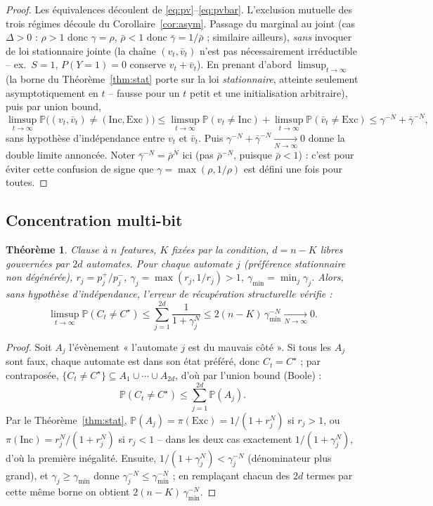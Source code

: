 \documentclass[12pt,a4paper]{article}
\newtheorem{theorem}{Théorème}
\newcommand{\Inc}{\ensuremath{\mathrm{Inc}}}
\newcommand{\Exc}{\ensuremath{\mathrm{Exc}}}
\newcommand{\vbar}{\bar{v}}
\begin{document}
\begin{proof}
Les équivalences découlent de \eqref{eq:pv}--\eqref{eq:pvbar}. L'exclusion
mutuelle des trois régimes découle du Corollaire~\ref{cor:asym}. Passage du
marginal au joint (cas $\Delta>0$ : $\rho>1$ donc $\gamma=\rho$, $\bar\rho<1$
donc $\bar\gamma=1/\bar\rho$ ; similaire ailleurs), \emph{sans} invoquer de loi
stationnaire jointe (la chaîne $(v_t,\vbar_t)$ n'est pas nécessairement
irréductible -- ex.\ $S{=}1$, $P(Y{=}1){=}0$ conserve $v_t+\vbar_t$). En
prenant d'abord $\limsup_{t\to\infty}$ (la borne du Théorème~\ref{thm:stat}
porte sur la loi \emph{stationnaire}, atteinte seulement asymptotiquement en
$t$ -- fausse pour un $t$ petit et une initialisation arbitraire), puis par
union bound,
\[
  \limsup_{t\to\infty}\mathbb P\bigl((v_t,\vbar_t)\ne(\Inc,\Exc)\bigr)
  \le \limsup_{t\to\infty}\mathbb P(v_t\ne\Inc)+\limsup_{t\to\infty}\mathbb P(\vbar_t\ne\Exc)
  \le \gamma^{-N}+\bar\gamma^{-N},
\]
sans hypothèse d'indépendance entre $v_t$ et $\vbar_t$. Puis
$\gamma^{-N}+\bar\gamma^{-N}\xrightarrow[N\to\infty]{}0$ donne la double
limite annoncée. Noter $\bar\gamma^{-N}=\bar\rho^N$ ici (pas $\bar\rho^{-N}$,
puisque $\bar\rho<1$) : c'est pour éviter cette confusion de signe que
$\gamma=\max(\rho,1/\rho)$ est défini une fois pour toutes.
\end{proof}



\subsection*{Concentration multi-bit}

\begin{theorem}\label{thm:multi}
Clause à $n$ features, $K$ fixées par la condition, $d=n-K$ libres gouvernées par
$2d$ automates. Pour chaque automate $j$ (préférence stationnaire non
dégénérée), $r_j=p_j^+/p_j^-$, $\gamma_j=\max(r_j,1/r_j)>1$,
$\gamma_{\min}=\min_j\gamma_j$. Alors, sans hypothèse d'indépendance,
l'erreur de \emph{récupération structurelle} vérifie :
\[
  \limsup_{t\to\infty}\mathbb P(C_t\ne C^\star) \le \sum_{j=1}^{2d}\frac1{1+\gamma_j^N}
  \le 2(n-K)\,\gamma_{\min}^{-N} \xrightarrow[N\to\infty]{} 0.
\]
\end{theorem}

\begin{proof}
Soit $A_j$ l'évènement « l'automate $j$ est du mauvais côté ». Si tous les
$A_j$ sont faux, chaque automate est dans son état préféré, donc $C_t=C^\star$ ;
par contraposée, $\{C_t\ne C^\star\}\subseteq A_1\cup\cdots\cup A_{2d}$, d'où
par l'union bound (Boole) :
\[
  \mathbb P(C_t\ne C^\star)\le\sum_{j=1}^{2d}\mathbb P(A_j).
\]
Par le Théorème~\ref{thm:stat}, $\mathbb P(A_j)=\pi(\Exc)=1/(1+r_j^N)$ si
$r_j>1$, ou $\pi(\Inc)=r_j^N/(1+r_j^N)$ si $r_j<1$ -- dans les deux cas
exactement $1/(1+\gamma_j^N)$, d'où la première inégalité. Ensuite,
$1/(1+\gamma_j^N)<\gamma_j^{-N}$ (dénominateur plus grand), et
$\gamma_j\ge\gamma_{\min}$ donne $\gamma_j^{-N}\le\gamma_{\min}^{-N}$ ; en
remplaçant chacun des $2d$ termes par cette même borne on obtient
$2(n-K)\,\gamma_{\min}^{-N}$.
\end{proof}
\end{document}
